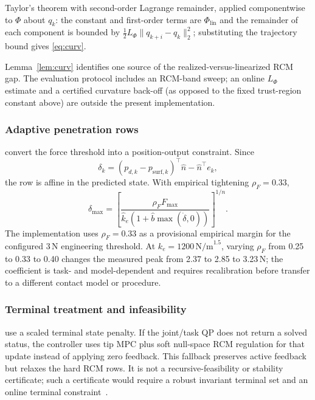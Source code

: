 \begin{IEEEproof}
Taylor's theorem with second-order Lagrange remainder, applied componentwise to $\Phi$ about $q_k$: the constant and first-order terms are $\Phi_{\text{lin}}$ and the remainder of each component is bounded by $\tfrac12 L_\Phi\|q_{k+i}-q_k\|_2^2$; substituting the trajectory bound gives \eqref{eq:curv}.
\end{IEEEproof}

Lemma~\ref{lem:curv} identifies one source of the realized-versus-linearized RCM gap. The evaluation protocol includes an RCM-band sweep; an online $L_\Phi$ estimate and a certified curvature back-off (as opposed to the fixed trust-region constant above) are outside the present implementation.

\subsubsection{Adaptive penetration rows} convert the force threshold into a position-output constraint. Since
\begin{equation}
\delta_k=(p_{d,k}-p_{\text{surf},k})^\top\hat n-\hat n^\top e_k,
\end{equation}
the row is affine in the predicted state. With empirical tightening $\rho_F=0.33$,
\begin{equation}
\delta_{\max}=
\left[
\frac{\rho_FF_{\max}}
{\hat k_e(1+\hat b\max(\dot\delta,0))}
\right]^{1/n}.
\label{eq:deltamax}
\end{equation}
The implementation uses $\rho_F=0.33$ as a provisional empirical margin for the configured 3\,N engineering threshold. At $k_e=1200\,\mathrm{N/m}^{1.5}$, varying $\rho_F$ from 0.25 to 0.33 to 0.40 changes the measured peak from 2.37 to 2.85 to 3.23\,N; the coefficient is task- and model-dependent and requires recalibration before transfer to a different contact model or procedure.

\subsubsection{Terminal treatment and infeasibility} use a scaled terminal state penalty. If the joint/task QP does not return a solved status, the controller uses tip MPC plus soft null-space RCM regulation for that update instead of applying zero feedback. This fallback preserves active feedback but relaxes the hard RCM rows. It is not a recursive-feasibility or stability certificate; such a certificate would require a robust invariant terminal set and an online terminal constraint~\cite{mayne2000}.

